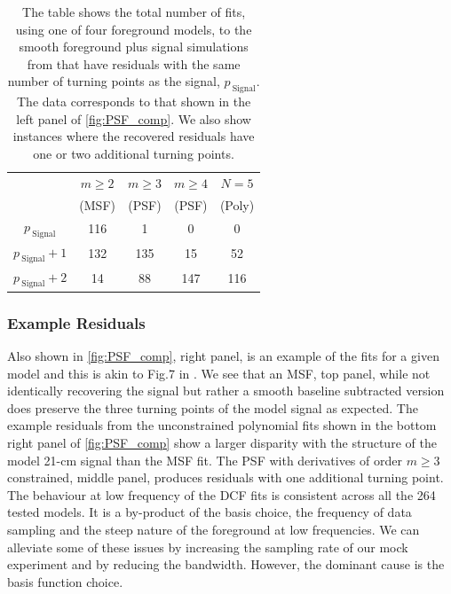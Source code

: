 \begin{table}
    \centering
    \begin{tabular}{ccccc}
        \hline
          & $m\geq2$ & $m\geq3$ & $m\geq4$ &$N = 5$ \\
          & (MSF) & (PSF) & (PSF) & (Poly) \\
         \hline
         $p_{\mathrm{~Signal}}$ & 116 & 1 & 0 & 0 \\
         $p_{\mathrm{~Signal}}+1$ & 132 & 135 & 15 & 52 \\
         $p_{\mathrm{~Signal}}+2$ & 14 & 88 & 147 & 116 \\
    \end{tabular}
    \caption{The table shows the total number of fits, using one of four foreground models, to the smooth foreground plus signal simulations from \protect\cite{Cohen_global_2017} that have residuals with the same number of turning points as the signal, $p_\mathrm{~Signal}$. The data corresponds to that shown in the left panel of \cref{fig:PSF_comp}. We also show instances where the recovered residuals have one or two additional turning points.}
    \label{tab:table1}
\end{table}

\subsubsection{Example Residuals}

Also shown in \cref{fig:PSF_comp}, right panel, is an example of the fits for a given model and this is akin to Fig.7 in \cite{Sathyanarayana_msf_2017}. We see that an MSF, top panel, while not identically recovering the signal but rather a smooth baseline subtracted version does preserve the three turning points of the model signal as expected. The example residuals from the unconstrained polynomial fits shown in the bottom right panel of \cref{fig:PSF_comp} show a larger disparity with the structure of the model 21-cm signal than the MSF fit. The PSF with derivatives of order $m \geq 3$ constrained,  middle panel, produces residuals with one additional turning point. The behaviour at low frequency of the DCF fits is consistent across all the 264 tested models. It is a by-product of the basis choice, the frequency of data sampling and the steep nature of the foreground at low frequencies. We can alleviate some of these issues by increasing the sampling rate of our mock experiment and by reducing the bandwidth. However, the dominant cause is the basis function choice.


